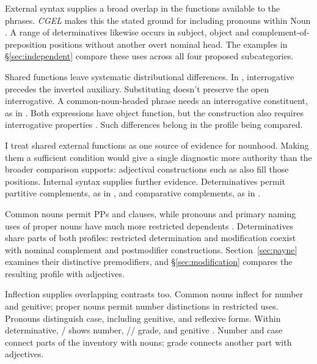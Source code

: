 \documentclass[12pt]{article}
\begin{document}
External syntax supplies a broad overlap in the functions available to the phrases. \textit{CGEL} makes this the stated ground for including pronouns within Noun \citep[327]{huddleston2002}. A range of determinatives likewise occurs in subject, object and complement-of-preposition positions without another overt nominal head. The examples in §\ref{sec:independent} compare these uses across all four proposed subcategories.

Shared functions leave systematic distributional differences. In , interrogative  precedes the inverted auxiliary. Substituting  doesn't preserve the open interrogative. A common-noun-headed phrase needs an interrogative constituent, as in . Both expressions have object function, but the construction also requires interrogative properties \citep[Ch.~10, §§7.1, 7.9]{huddleston2002}. Such differences belong in the profile being compared.

I treat shared external functions as one source of evidence for nounhood. Making them a sufficient condition would give a single diagnostic more authority than the broader comparison supports: adjectival constructions such as  also fill those positions. Internal syntax supplies further evidence. Determinatives permit partitive complements, as in , and comparative complements, as in  \citep[392--394, 411--412, 432--433]{huddleston2002}.

Common nouns permit PPs and clauses, while pronouns and primary naming uses of proper nouns have much more restricted dependents \citep[429--430, 439--443, 517--521]{huddleston2002}. Determinatives share parts of both profiles: restricted determination and modification coexist with nominal complement and postmodifier constructions. Section~\ref{sec:payne} examines their distinctive premodifiers, and §\ref{sec:modification} compares the resulting profile with adjectives.

Inflection supplies overlapping contrasts too. Common nouns inflect for number and genitive; proper nouns permit number distinctions in restricted uses. Pronouns distinguish case, including genitive, and reflexive forms. Within determinative, / shows number, // grade, and  genitive \citep[373, 423--424, 426, 479--480, 521]{huddleston2002}. Number and case connect parts of the inventory with nouns; grade connects another part with adjectives.
\end{document}
